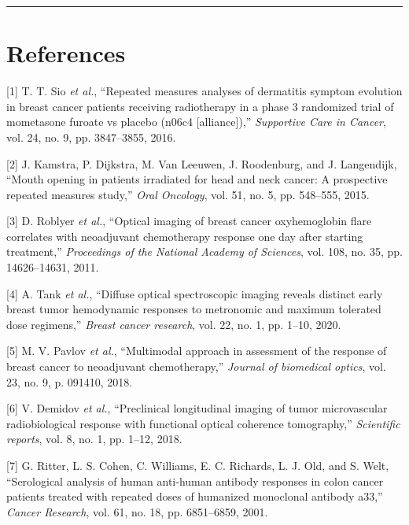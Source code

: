 \documentclass[
]{article}
\begin{document}
\begin{center}\rule{0.5\linewidth}{0.5pt}\end{center}

\hypertarget{references}{%
\section*{References}\label{references}}

\hypertarget{refs}{}
\leavevmode\hypertarget{ref-sio2016}{}%
{[}1{]} T. T. Sio \emph{et al.}, ``Repeated measures analyses of dermatitis symptom evolution in breast cancer patients receiving radiotherapy in a phase 3 randomized trial of mometasone furoate vs placebo (n06c4 {[}alliance{]}),'' \emph{Supportive Care in Cancer}, vol. 24, no. 9, pp. 3847--3855, 2016.

\leavevmode\hypertarget{ref-kamstra2015}{}%
{[}2{]} J. Kamstra, P. Dijkstra, M. Van Leeuwen, J. Roodenburg, and J. Langendijk, ``Mouth opening in patients irradiated for head and neck cancer: A prospective repeated measures study,'' \emph{Oral Oncology}, vol. 51, no. 5, pp. 548--555, 2015.

\leavevmode\hypertarget{ref-roblyer2011}{}%
{[}3{]} D. Roblyer \emph{et al.}, ``Optical imaging of breast cancer oxyhemoglobin flare correlates with neoadjuvant chemotherapy response one day after starting treatment,'' \emph{Proceedings of the National Academy of Sciences}, vol. 108, no. 35, pp. 14626--14631, 2011.

\leavevmode\hypertarget{ref-tank2020}{}%
{[}4{]} A. Tank \emph{et al.}, ``Diffuse optical spectroscopic imaging reveals distinct early breast tumor hemodynamic responses to metronomic and maximum tolerated dose regimens,'' \emph{Breast cancer research}, vol. 22, no. 1, pp. 1--10, 2020.

\leavevmode\hypertarget{ref-pavlov2018}{}%
{[}5{]} M. V. Pavlov \emph{et al.}, ``Multimodal approach in assessment of the response of breast cancer to neoadjuvant chemotherapy,'' \emph{Journal of biomedical optics}, vol. 23, no. 9, p. 091410, 2018.

\leavevmode\hypertarget{ref-demidov2018}{}%
{[}6{]} V. Demidov \emph{et al.}, ``Preclinical longitudinal imaging of tumor microvascular radiobiological response with functional optical coherence tomography,'' \emph{Scientific reports}, vol. 8, no. 1, pp. 1--12, 2018.

\leavevmode\hypertarget{ref-ritter2001}{}%
{[}7{]} G. Ritter, L. S. Cohen, C. Williams, E. C. Richards, L. J. Old, and S. Welt, ``Serological analysis of human anti-human antibody responses in colon cancer patients treated with repeated doses of humanized monoclonal antibody a33,'' \emph{Cancer Research}, vol. 61, no. 18, pp. 6851--6859, 2001.
\end{document}
